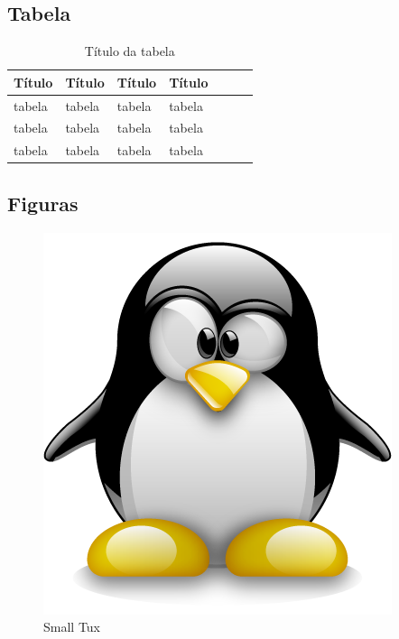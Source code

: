 \lipsum[1-1]
\subsection{Tabela}
\begin{table}[htb]
	
	\label{tab-inicial}
\begin{center}
	\changecaptionwidth 
	\captionwidth{12.2cm}
    \caption[Título na lista de tabelas]{Título da tabela}
    \begin{tabular}{p{2.6cm}lp{6.0cm}lp{2.25cm}lp{3.40cm}}
  		 \hline
    	\textbf{Título} & \textbf{Título} & \textbf{Título} & \textbf{Título} \\ \hline
   		 tabela & tabela & tabela & tabela\\
         tabela & tabela & tabela & tabela\\
  		 tabela & tabela & tabela & tabela\\ \hline
    \end{tabular}
\end{center}
\end{table}

\lipsum[1-1]
\subsection{Figuras}
\lipsum[1-1]
\begin{figure}[htb]
	\begin{center}
		\changecaptionwidth 
		\captionwidth{5.2cm}
		\caption{\label{fig_grafico}Small Tux}
	    \includegraphics[scale=0.2]{figuras/tux.png}
	\end{center}
\end{figure}

